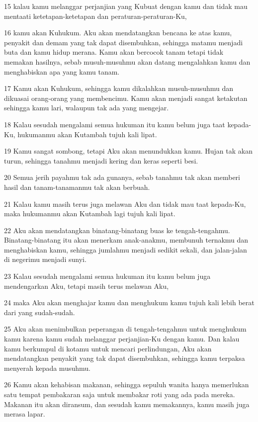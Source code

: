 \par 15 kalau kamu melanggar perjanjian yang Kubuat dengan kamu dan tidak mau mentaati ketetapan-ketetapan dan peraturan-peraturan-Ku,
\par 16 kamu akan Kuhukum. Aku akan mendatangkan bencana ke atas kamu, penyakit dan demam yang tak dapat disembuhkan, sehingga matamu menjadi buta dan kamu hidup merana. Kamu akan bercocok tanam tetapi tidak memakan hasilnya, sebab musuh-musuhmu akan datang mengalahkan kamu dan menghabiskan apa yang kamu tanam.
\par 17 Kamu akan Kuhukum, sehingga kamu dikalahkan musuh-musuhmu dan dikuasai orang-orang yang membencimu. Kamu akan menjadi sangat ketakutan sehingga kamu lari, walaupun tak ada yang mengejar.
\par 18 Kalau sesudah mengalami semua hukuman itu kamu belum juga taat kepada-Ku, hukumanmu akan Kutambah tujuh kali lipat.
\par 19 Kamu sangat sombong, tetapi Aku akan menundukkan kamu. Hujan tak akan turun, sehingga tanahmu menjadi kering dan keras seperti besi.
\par 20 Semua jerih payahmu tak ada gunanya, sebab tanahmu tak akan memberi hasil dan tanam-tanamanmu tak akan berbuah.
\par 21 Kalau kamu masih terus juga melawan Aku dan tidak mau taat kepada-Ku, maka hukumanmu akan Kutambah lagi tujuh kali lipat.
\par 22 Aku akan mendatangkan binatang-binatang buas ke tengah-tengahmu. Binatang-binatang itu akan menerkam anak-anakmu, membunuh ternakmu dan menghabiskan kamu, sehingga jumlahmu menjadi sedikit sekali, dan jalan-jalan di negerimu menjadi sunyi.
\par 23 Kalau sesudah mengalami semua hukuman itu kamu belum juga mendengarkan Aku, tetapi masih terus melawan Aku,
\par 24 maka Aku akan menghajar kamu dan menghukum kamu tujuh kali lebih berat dari yang sudah-sudah.
\par 25 Aku akan menimbulkan peperangan di tengah-tengahmu untuk menghukum kamu karena kamu sudah melanggar perjanjian-Ku dengan kamu. Dan kalau kamu berkumpul di kotamu untuk mencari perlindungan, Aku akan mendatangkan penyakit yang tak dapat disembuhkan, sehingga kamu terpaksa menyerah kepada musuhmu.
\par 26 Kamu akan kehabisan makanan, sehingga sepuluh wanita hanya memerlukan satu tempat pembakaran saja untuk membakar roti yang ada pada mereka. Makanan itu akan diransum, dan sesudah kamu memakannya, kamu masih juga merasa lapar.
